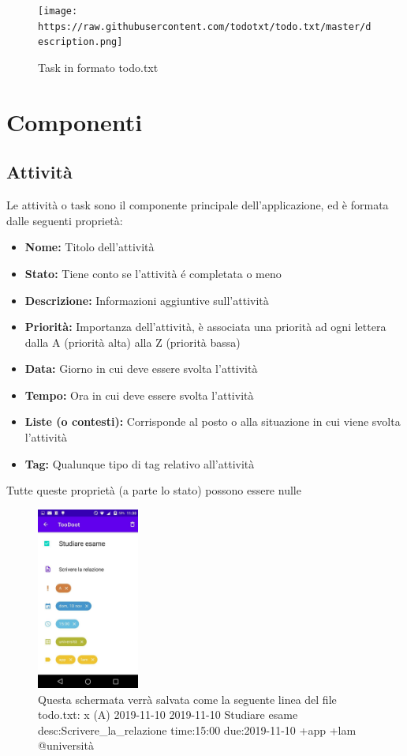 \documentclass[]{article}
\providecommand{\tightlist}{%
  \setlength{\itemsep}{0pt}\setlength{\parskip}{0pt}}
\begin{document}
\begin{figure}
\centering
\texttt{[image: https://raw.githubusercontent.com/todotxt/todo.txt/master/description.png]}
\caption{Task in formato todo.txt}
\end{figure}

\hypertarget{componenti}{%
\section{Componenti}\label{componenti}}

\hypertarget{attivitaux300}{%
\subsection{Attività}\label{attivitaux300}}

Le attività o task sono il componente principale dell'applicazione, ed è
formata dalle seguenti proprietà:

\begin{itemize}
\tightlist
\item
  \textbf{Nome:} Titolo dell'attività
\item
  \textbf{Stato:} Tiene conto se l'attività é completata o meno
\item
  \textbf{Descrizione:} Informazioni aggiuntive sull'attività
\item
  \textbf{Priorità:} Importanza dell'attività, è associata una priorità
  ad ogni lettera dalla A (priorità alta) alla Z (priorità bassa)
\item
  \textbf{Data:} Giorno in cui deve essere svolta l'attività
\item
  \textbf{Tempo:} Ora in cui deve essere svolta l'attività
\item
  \textbf{Liste (o contesti):} Corrisponde al posto o alla situazione in
  cui viene svolta l'attività
\item
  \textbf{Tag:} Qualunque tipo di tag relativo all'attività
\end{itemize}

Tutte queste proprietà (a parte lo stato) possono essere nulle

\begin{figure}
\centering
\includegraphics[width=0.3\textwidth,height=0.1\textheight]{./img/schermata_edit.jpg}
\caption{Questa schermata verrà salvata come la seguente linea del file
todo.txt: x (A) 2019-11-10 2019-11-10 Studiare esame
desc:Scrivere\_la\_relazione time:15:00 due:2019-11-10 +app +lam
@università}
\end{figure}
\end{document}
